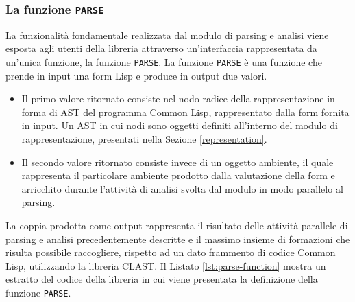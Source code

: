 \subsubsection{La funzione \texttt{PARSE}}

La funzionalità fondamentale realizzata dal modulo di parsing e analisi viene
esposta agli utenti della libreria attraverso un'interfaccia rappresentata da
un’unica funzione, la funzione \texttt{PARSE}. La funzione \texttt{PARSE} è una
funzione che prende in input una form Lisp e produce in output due valori.

\begin{itemize}

\item Il primo valore ritornato consiste nel nodo radice della rappresentazione
in forma di AST del programma Common Lisp, rappresentato dalla form fornita in
input. Un AST in cui nodi sono oggetti definiti all’interno del modulo di
rappresentazione, presentati nella Sezione \ref{representation}.

\item Il secondo valore ritornato consiste invece di un oggetto ambiente, il
quale rappresenta il particolare ambiente prodotto dalla valutazione della form
e arricchito durante l'attività di analisi svolta dal modulo in modo parallelo
al parsing.

\end{itemize}

La coppia prodotta come output rappresenta il risultato delle attività parallele
di parsing e analisi precedentemente descritte e il massimo insieme di
formazioni che risulta possibile raccogliere, rispetto ad un dato frammento di
codice Common Lisp, utilizzando la libreria CLAST. Il Listato
\ref{lst:parse-function} mostra un estratto del codice della libreria in cui
viene presentata la definizione della funzione \texttt{PARSE}.

